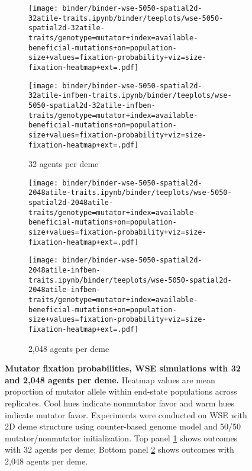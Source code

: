 \begin{figure}[h]
    \begin{subfigure}[b]{\linewidth}
        \begin{minipage}{0.5\linewidth}
          \texttt{[image: binder/binder-wse-5050-spatial2d-32atile-traits.ipynb/binder/teeplots/wse-5050-spatial2d-32atile-traits/genotype=mutator+index=available-beneficial-mutations+on=population-size+values=fixation-probability+viz=size-fixation-heatmap+ext=.pdf]}%
        \end{minipage}
        \begin{minipage}{0.5\linewidth}
          \texttt{[image: binder/binder-wse-5050-spatial2d-32atile-infben-traits.ipynb/binder/teeplots/wse-5050-spatial2d-32atile-infben-traits/genotype=mutator+index=available-beneficial-mutations+on=population-size+values=fixation-probability+viz=size-fixation-heatmap+ext=.pdf]}%
        \end{minipage}

        \caption{32 agents per deme}
        \label{fig:fixheat-wse-altatile:32}

    \end{subfigure}

\begin{subfigure}[b]{\linewidth}
    \begin{minipage}{0.5\linewidth}
          \texttt{[image: binder/binder-wse-5050-spatial2d-2048atile-traits.ipynb/binder/teeplots/wse-5050-spatial2d-2048atile-traits/genotype=mutator+index=available-beneficial-mutations+on=population-size+values=fixation-probability+viz=size-fixation-heatmap+ext=.pdf]}%
    \end{minipage}%
    \begin{minipage}{0.5\linewidth}
          \texttt{[image: binder/binder-wse-5050-spatial2d-2048atile-infben-traits.ipynb/binder/teeplots/wse-5050-spatial2d-2048atile-infben-traits/genotype=mutator+index=available-beneficial-mutations+on=population-size+values=fixation-probability+viz=size-fixation-heatmap+ext=.pdf]}%
    \end{minipage}

\caption{2,048 agents per deme}
\label{fig:fixheat-wse-altatile:2048}
\end{subfigure}

  \begin{minipage}{\linewidth}
    \caption{%
\textbf{Mutator fixation probabilities, WSE simulations with 32 and 2,048 agents per deme.}
\footnotesize
Heatmap values are mean proportion of mutator allele within end-state populations across replicates.
Cool hues indicate nonmutator favor and warm hues indicate mutator favor.
Experiments were conducted on WSE with 2D deme structure using counter-based genome model and 50/50 mutator/nonmutator initialization.
Top panel \ref{fig:fixheat-wse-altatile:32} shows outcomes with 32 agents per deme;
Bottom panel \ref{fig:fixheat-wse-altatile:2048} shows outcomes with 2,048 agents per deme.
    }
    \label{fig:fixheat-wse-altatile}
  \end{minipage}
\end{figure}
